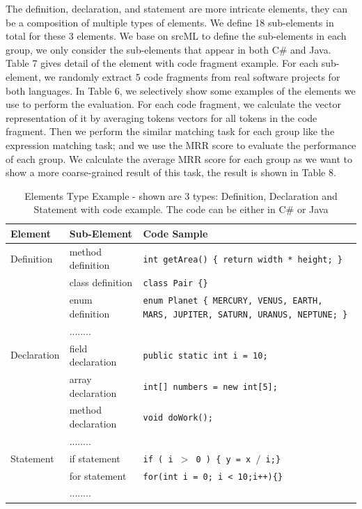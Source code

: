The definition, declaration, and statement are more intricate elements, they can be a composition of multiple types of elements. We define 18 sub-elements in total for these 3 elements. We base on srcML \cite{collard2011lightweight} to define the sub-elements in each group, we only consider the sub-elements that appear in both C\# and Java. Table 7 gives detail of the element with code fragment example. For each sub-element, we randomly extract 5 code fragments from real software projects for both languages. In Table 6, we selectively show some examples of the elements we use to perform the evaluation. For each code fragment, we calculate the vector representation of it by averaging tokens vectors for all tokens in the code fragment. Then we perform the similar matching task for each group like the expression matching task; and we use the MRR score to evaluate the performance of each group.  We calculate the average MRR score for each group as we want to show a more coarse-grained result of this task, the result is shown in Table 8.


\begin{table}
	\label{tab:freq}
	
	\begin{tabular}{p{2cm}|l|p{5cm}}
		
		\hline
		Element &Sub-Element& Code Sample\\
		\hline
		Definition & method definition & \texttt{int getArea() \{
			return width * height;
			\}}\\\cline{2-3}
		
		& class definition & \texttt{class Pair \{\}}\\\cline{2-3}
		
		& enum definition & \texttt{enum Planet \{ MERCURY, VENUS, EARTH, MARS, JUPITER, SATURN, URANUS, NEPTUNE; \}}   \\\cline{2-3}
		
		& ........ &  \\\cline{2-3}
		\hline
		
		
		Declaration & field declaration & \texttt{public static int i = 10;} \\\cline{2-3}
		
		
		& array declaration & \texttt{int[] numbers = new int[5];} \\\cline{2-3}
		
		& method declaration & \texttt{void doWork();} \\\cline{2-3}
		
		
		& ........ &  \\\cline{2-3}
		\hline
		Statement & if statement & \texttt{if ( i $>$ 0 ) \{ y = x $/$ i;\}}\\\cline{2-3}
		
		& for statement & \texttt{for(int i = 0; i < 10;i++)\{\}}\\\cline{2-3}
		& ........ & \\\cline{1-3}
		
	\end{tabular}
	\medskip
	\caption{Elements Type Example - shown are 3 types: Definition, Declaration and Statement with code example. The code can be either in C\# or Java}
\end{table}



